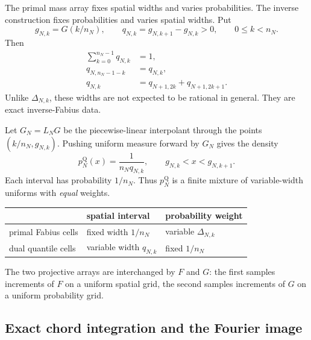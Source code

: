 \documentclass[11pt]{article}
\theoremstyle{definition}
\theoremstyle{remark}
\begin{document}
The primal mass array fixes spatial widths and varies probabilities.  The
inverse construction fixes probabilities and varies spatial widths.  Put
\begin{equation}\label{p3:eq:gNk-qNk}
 g_{N,k}=G(k/n_N),
 \qquad
 q_{N,k}=g_{N,k+1}-g_{N,k}>0,
 \qquad 0\le k<n_N.
\end{equation}
Then
\begin{align}
 \sum_{k=0}^{n_N-1}q_{N,k}&=1,\label{p3:eq:q-sum}\\
 q_{N,n_N-1-k}&=q_{N,k},\label{p3:eq:q-symmetry}\\
 q_{N,k}&=q_{N+1,2k}+q_{N+1,2k+1}.
 \label{p3:eq:q-projective}
\end{align}
Unlike $\Delta_{N,k}$, these widths are not expected to be rational in general.
They are exact inverse-Fabius data.

Let $G_N=L_NG$ be the piecewise-linear interpolant through the points
$(k/n_N,g_{N,k})$.  Pushing uniform measure forward by $G_N$ gives the density
\begin{equation}\label{p3:eq:pQN}
 p_N^{\mathrm Q}(x)
 =\frac{1}{n_Nq_{N,k}},
 \qquad g_{N,k}<x<g_{N,k+1}.
\end{equation}
Each interval has probability $1/n_N$.  Thus $p_N^{\mathrm Q}$ is a finite
mixture of variable-width uniforms with \emph{equal} weights.

\begin{resultboxPartl}
\begin{center}
\begin{tabular}{@{}lll@{}}
\toprule
 & spatial interval & probability weight\\
\midrule
primal Fabius cells & fixed width $1/n_N$ & variable $\Delta_{N,k}$\\
dual quantile cells & variable width $q_{N,k}$ & fixed $1/n_N$\\
\bottomrule
\end{tabular}
\end{center}
The two projective arrays are interchanged by $F$ and $G$: the first samples
increments of $F$ on a uniform spatial grid, the second samples increments of
$G$ on a uniform probability grid.
\end{resultboxPartl}

\subsection{Exact chord integration and the Fourier image}
\end{document}
